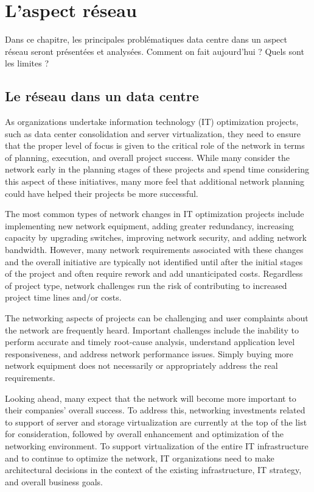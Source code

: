 


\chapter{L'aspect réseau}
Dans ce chapitre, les principales problématiques data centre dans un aspect réseau seront présentées et analysées.  Comment on fait aujourd'hui ? Quels sont les limites ? 


\section{Le réseau dans un data centre}
As organizations undertake information technology (IT) optimization projects, such as data center consolidation and server virtualization, they need to ensure that the proper level of focus is given to the critical role of the network in terms of planning, execution, and overall project success. While many consider the network early in the planning stages of these projects and spend time considering this aspect of these initiatives, many more feel that additional network planning could have helped their projects be more successful.


The most common types of network changes in IT optimization projects include implementing new network equipment, adding greater redundancy, increasing capacity by upgrading switches, improving network security, and adding network bandwidth. However, many network requirements associated with these changes and the overall initiative are typically not identified until after the initial stages of the project and often require rework and add unanticipated costs. Regardless of project type, network challenges run the risk of contributing to increased project time lines and/or costs.


The networking aspects of projects can be challenging and user complaints about the network are frequently heard. Important challenges include the inability to perform accurate and timely root-cause analysis, understand application level responsiveness, and address network performance issues. Simply buying more network equipment does not necessarily or appropriately address the real requirements.


Looking ahead, many expect that the network will become more important to their companies' overall success. To address this, networking investments related to support of server and storage virtualization are currently at the top of the list for consideration, followed by overall enhancement and optimization of the networking environment.
To support virtualization of the entire IT infrastructure and to continue to optimize the network, IT organizations need to make architectural decisions in the context of the existing infrastructure, IT strategy, and overall business goals.


